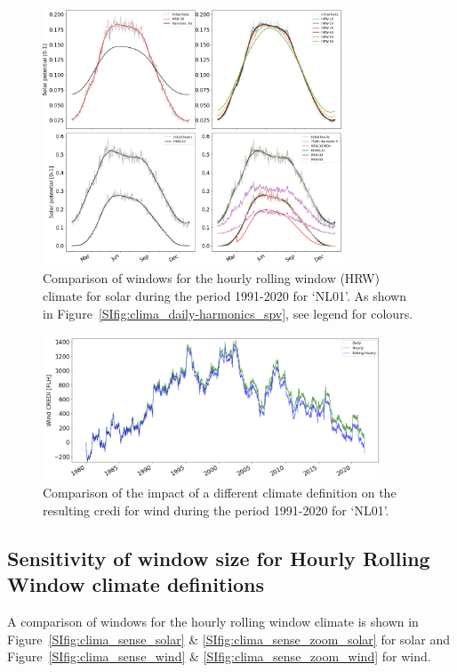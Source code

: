 \documentclass[a4paper,11pt]{extarticle}
\newcommand{\credi}[0]{{\sc credi}}
\begin{document}
\begin{figure}[t]
    \centering
    \includegraphics[width=0.8\textwidth]{Fig_ClimatologyComparison_SPV}
    \caption{
    Comparison of windows for the hourly rolling window (HRW) climate for solar during the period 1991-2020 for `NL01'. 
    As shown in Figure~\ref{SIfig:clima_daily-harmonics_spv}, see legend for colours. }
    \label{SIfig:clima_daily-harmonics_won}
\end{figure}

\begin{figure}[ht!]
    \centering
    \includegraphics[width=0.9\textwidth]{Fig_ClimComparison_WON}
    \caption{
    Comparison of the impact of a different climate definition on the resulting \credi{} for wind during the period 1991-2020 for `NL01'.}
    \label{SIfig:clima_impact}
\end{figure}



\clearpage

\subsection{Sensitivity of window size for Hourly Rolling Window climate definitions }\label{app:sense}
A comparison of windows for the hourly rolling window climate is shown in Figure~\ref{SIfig:clima_sense_solar} \& \ref{SIfig:clima_sense_zoom_solar} for solar and Figure~\ref{SIfig:clima_sense_wind} \& \ref{SIfig:clima_sense_zoom_wind} for wind. 
\end{document}
